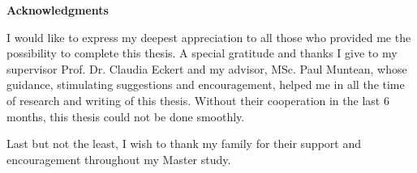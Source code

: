 \clearemptydoublepage
{}
{}	



\vspace*{2cm}

\begin{center}
{\Large \bf Acknowledgments}
\end{center}

\vspace{1cm}




I would like to express my deepest appreciation to all those who provided me the possibility to complete this thesis. A special gratitude and thanks I give to my supervisor Prof. Dr. Claudia Eckert and my advisor, MSc. Paul Muntean, whose guidance, stimulating suggestions and encouragement, helped me in all the time of research and writing of this thesis. Without their cooperation in the last 6 months, this thesis could not be done smoothly.

Last but not the least, I wish to thank my family for their support and encouragement throughout my Master study.